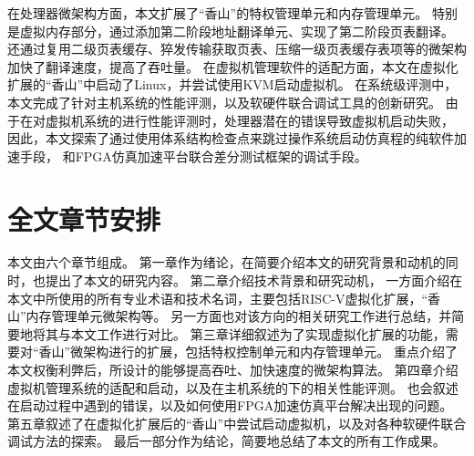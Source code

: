 在处理器微架构方面，本文扩展了“香山”的特权管理单元和内存管理单元。
特别是虚拟内存部分，通过添加第二阶段地址翻译单元、实现了第二阶段页表翻译。
还通过复用二级页表缓存、猝发传输获取页表、压缩一级页表缓存表项等的微架构加快了翻译速度，提高了吞吐量。
在虚拟机管理软件的适配方面，本文在虚拟化扩展的“香山”中启动了Linux，并尝试使用KVM启动虚拟机。
在系统级评测中，本文完成了针对主机系统的性能评测，以及软硬件联合调试工具的创新研究。
由于在对虚拟机系统的进行性能评测时，处理器潜在的错误导致虚拟机启动失败，
因此，本文探索了通过使用体系结构检查点来跳过操作系统启动仿真程的纯软件加速手段，
和FPGA仿真加速平台联合差分测试框架的调试手段。

\section{全文章节安排}
本文由六个章节组成。
第一章作为绪论，在简要介绍本文的研究背景和动机的同时，也提出了本文的研究内容。
第二章介绍技术背景和研究动机，
一方面介绍在本文中所使用的所有专业术语和技术名词，主要包括RISC-V虚拟化扩展，“香山”内存管理单元微架构等。
另一方面也对该方向的相关研究工作进行总结，并简要地将其与本文工作进行对比。
第三章详细叙述为了实现虚拟化扩展的功能，需要对“香山”微架构进行的扩展，包括特权控制单元和内存管理单元。
重点介绍了本文权衡利弊后，所设计的能够提高吞吐、加快速度的微架构算法。
第四章介绍虚拟机管理系统的适配和启动，以及在主机系统的下的相关性能评测。
也会叙述在启动过程中遇到的错误，以及如何使用FPGA加速仿真平台解决出现的问题。
第五章叙述了在虚拟化扩展后的“香山”中尝试启动虚拟机，以及对各种软硬件联合调试方法的探索。
最后一部分作为结论，简要地总结了本文的所有工作成果。